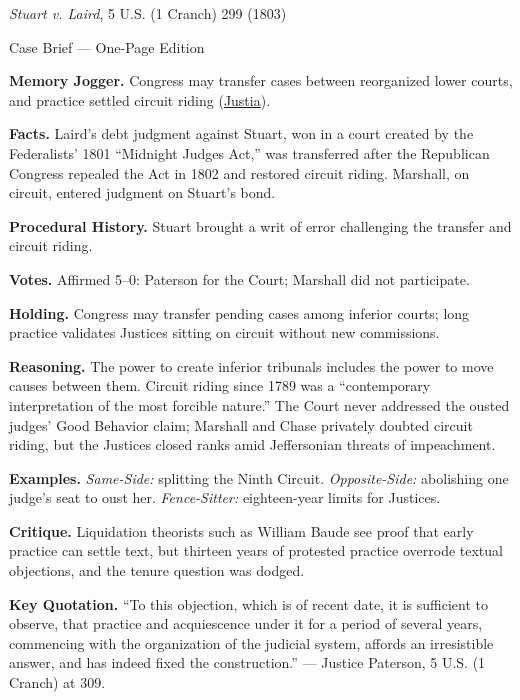 \documentclass[12pt]{article}
\begin{document}
\begin{center}
{\Large \textit{Stuart v. Laird}, 5 U.S. (1 Cranch) 299 (1803)\par}
\vspace{0.3em}
{\normalsize Case Brief --- One-Page Edition\par}
\end{center}

\textbf{Memory Jogger.} Congress may transfer cases between reorganized lower courts, and practice settled circuit riding (\href{https://supreme.justia.com/cases/federal/us/5/299/}{Justia}).

\textbf{Facts.} Laird's debt judgment against Stuart, won in a court created by the Federalists' 1801 ``Midnight Judges Act,'' was transferred after the Republican Congress repealed the Act in 1802 and restored circuit riding. Marshall, on circuit, entered judgment on Stuart's bond.

\textbf{Procedural History.} Stuart brought a writ of error challenging the transfer and circuit riding.

\textbf{Votes.} Affirmed 5--0: Paterson for the Court; Marshall did not participate.

\textbf{Holding.} Congress may transfer pending cases among inferior courts; long practice validates Justices sitting on circuit without new commissions.

\textbf{Reasoning.} The power to create inferior tribunals includes the power to move causes between them. Circuit riding since 1789 was a ``contemporary interpretation of the most forcible nature.'' The Court never addressed the ousted judges' Good Behavior claim; Marshall and Chase privately doubted circuit riding, but the Justices closed ranks amid Jeffersonian threats of impeachment.

\textbf{Examples.} \emph{Same-Side:} splitting the Ninth Circuit. \emph{Opposite-Side:} abolishing one judge's seat to oust her. \emph{Fence-Sitter:} eighteen-year limits for Justices.

\textbf{Critique.} Liquidation theorists such as William Baude see proof that early practice can settle text, but thirteen years of protested practice overrode textual objections, and the tenure question was dodged.

\textbf{Key Quotation.} ``To this objection, which is of recent date, it is sufficient to observe, that practice and acquiescence under it for a period of several years, commencing with the organization of the judicial system, affords an irresistible answer, and has indeed fixed the construction.'' --- Justice Paterson, 5 U.S. (1 Cranch) at 309.
\end{document}
